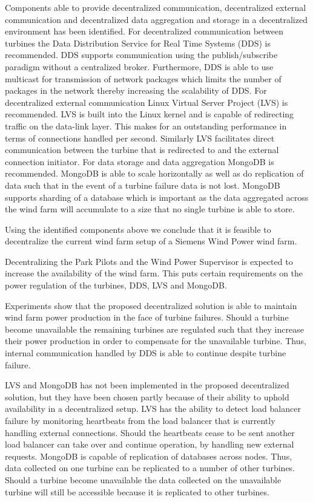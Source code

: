 Components able to provide decentralized communication, decentralized external communication and decentralized data aggregation and storage in a decentralized environment has been identified. For decentralized communication between turbines the Data Distribution Service for Real Time Systems (DDS) is recommended. DDS supports communication using the publish/subscribe paradigm without a centralized broker. Furthermore, DDS is able to use multicast for transmission of network packages which limits the number of packages in the network thereby increasing the scalability of DDS. For decentralized external communication Linux Virtual Server Project (LVS) is recommended. LVS is built into the Linux kernel and is capable of redirecting traffic on the data-link layer. This makes for an outstanding performance in terms of connections handled per second. Similarly LVS facilitates direct communication between the turbine that is redirected to and the external connection initiator. For data storage and data aggregation MongoDB is recommended. MongoDB is able to scale horizontally as well as do replication of data such that in the event of a turbine failure data is not lost. MongoDB supports sharding of a database which is important as the data aggregated across the wind farm will accumulate to a size that no single turbine is able to store.

Using the identified components above we conclude that it is feasible to decentralize the current wind farm setup of a Siemens Wind Power wind farm.

Decentralizing the Park Pilots and the Wind Power Supervisor is expected to increase the availability of the wind farm. This puts certain requirements on the power regulation of the turbines, DDS, LVS and MongoDB.

Experiments show that the proposed decentralized solution is able to maintain wind farm power production in the face of turbine failures. Should a turbine become unavailable the remaining turbines are regulated such that they increase their power production in order to compensate for the unavailable turbine. Thus, internal communication handled by DDS is able to continue despite turbine failure.

LVS and MongoDB has not been implemented in the proposed decentralized solution, but they have been chosen partly because of their ability to uphold availability in a decentralized setup. LVS has the ability to detect load balancer failure by monitoring heartbeats from the load balancer that is currently handling external connections. Should the heartbeats cease to be sent another load balancer can take over and continue operation, by handling new external requests. MongoDB is capable of replication of databases across nodes. Thus, data collected on one turbine can be replicated to a number of other turbines. Should a turbine become unavailable the data collected on the unavailable turbine will still be accessible because it is replicated to other turbines.

